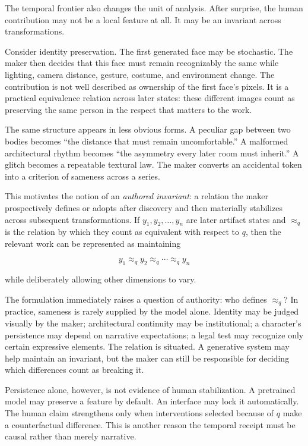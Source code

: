 \documentclass[11pt]{article}
\begin{document}
The temporal frontier also changes the unit of analysis. After surprise, the human contribution may not be a local feature at all. It may be an invariant across transformations.

Consider identity preservation. The first generated face may be stochastic. The maker then decides that this face must remain recognizably the same while lighting, camera distance, gesture, costume, and environment change. The contribution is not well described as ownership of the first face's pixels. It is a practical equivalence relation across later states: these different images count as preserving the same person in the respect that matters to the work.

The same structure appears in less obvious forms. A peculiar gap between two bodies becomes ``the distance that must remain uncomfortable.'' A malformed architectural rhythm becomes ``the asymmetry every later room must inherit.'' A glitch becomes a repeatable textural law. The maker converts an accidental token into a criterion of sameness across a series.

This motivates the notion of an \emph{authored invariant}: a relation the maker prospectively defines or adopts after discovery and then materially stabilizes across subsequent transformations. If $y_1, y_2, \ldots, y_n$ are later artifact states and $\approx_q$ is the relation by which they count as equivalent with respect to $q$, then the relevant work can be represented as maintaining

\[
y_1 \approx_q y_2 \approx_q \cdots \approx_q y_n
\]

while deliberately allowing other dimensions to vary.

The formulation immediately raises a question of authority: who defines $\approx_q$? In practice, sameness is rarely supplied by the model alone. Identity may be judged visually by the maker; architectural continuity may be institutional; a character's persistence may depend on narrative expectations; a legal test may recognize only certain expressive elements. The relation is situated. A generative system may help maintain an invariant, but the maker can still be responsible for deciding which differences count as breaking it.

Persistence alone, however, is not evidence of human stabilization. A pretrained model may preserve a feature by default. An interface may lock it automatically. The human claim strengthens only when interventions selected because of $q$ make a counterfactual difference. This is another reason the temporal receipt must be causal rather than merely narrative.
\end{document}
